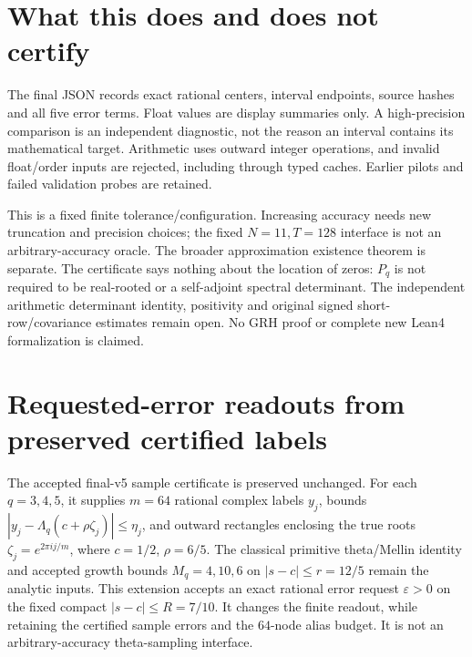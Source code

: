 \documentclass[11pt]{article}
\theoremstyle{definition}\newtheorem{definition}[theorem]{Definition}
\theoremstyle{remark}\newtheorem{remark}[theorem]{Remark}
\begin{document}
\section{What this does and does not certify}
The final JSON records exact rational centers, interval endpoints, source
hashes and all five error terms. Float values are display summaries only.
A high-precision comparison is an independent diagnostic, not the reason
an interval contains its mathematical target. Arithmetic uses outward
integer operations, and invalid float/order inputs are rejected, including
through typed caches. Earlier pilots and failed validation probes are retained.

This is a fixed finite tolerance/configuration. Increasing accuracy needs
new truncation and precision choices; the fixed $N=11,T=128$ interface is
not an arbitrary-accuracy oracle. The broader approximation existence theorem
is separate. The certificate says nothing about the location of zeros:
$P_q$ is not required to be real-rooted or a self-adjoint spectral determinant.
The independent arithmetic determinant identity, positivity and original
signed short-row/covariance estimates remain open. No GRH proof or complete
new Lean4 formalization is claimed.

\section{Requested-error readouts from preserved certified labels}\label{ar:requested}
The accepted final-v5 sample certificate is preserved unchanged. For each
$q=3,4,5$, it supplies $m=64$ rational complex labels $y_j$, bounds
$|y_j-\Lambda_q(c+\rho\zeta_j)|\le\eta_j$, and outward rectangles enclosing
the true roots $\zeta_j=e^{2\pi i j/m}$, where $c=1/2$, $\rho=6/5$.
The classical primitive theta/Mellin identity and accepted growth bounds
$M_q=4,10,6$ on $|s-c|\le r=12/5$ remain the analytic inputs.
This extension accepts an exact rational error request $\varepsilon>0$ on
the fixed compact $|s-c|\le R=7/10$. It changes the finite readout, while
retaining the certified sample errors and the $64$-node alias budget.
It is not an arbitrary-accuracy theta-sampling interface.
\end{document}
